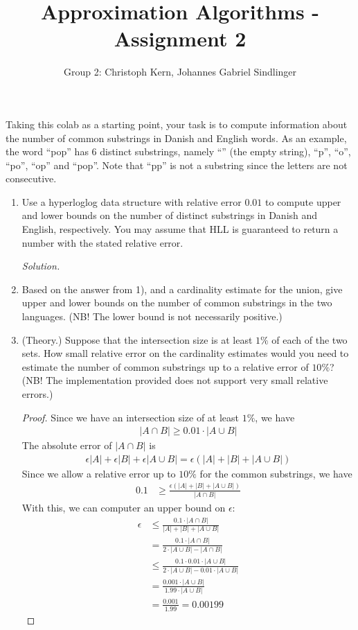 \documentclass{article}
\title{Approximation Algorithms - Assignment 2}
\author{Group 2: Christoph Kern, Johannes Gabriel Sindlinger}
\begin{document}
\maketitle

Taking this colab as a starting point, your task is to compute information about the number of common substrings in Danish and English words. As an example, the word ``pop'' has 6 distinct substrings, namely ``'' (the empty string), ``p'', ``o'', ``po'', ``op'' and ``pop''. Note that ``pp'' is not a substring since the letters are not consecutive.

\begin{enumerate}
    \item Use a hyperloglog data structure with relative error $0.01$ to compute upper and lower bounds on the number of distinct substrings in Danish and English, respectively. You may assume that HLL is guaranteed to return a number with the stated relative error.

    \emph{Solution.} 
    
    
    \item Based on the answer from 1), and a cardinality estimate for the union, give upper and lower bounds on the number of common substrings in the two languages. (NB! The lower bound is not necessarily positive.)
    \item (Theory.) Suppose that the intersection size is at least $1\%$ of each of the two sets. How small relative error on the cardinality estimates would you need to estimate the number of common substrings up to a relative error of $10\%$? (NB! The implementation provided does not support very small relative errors.)

    \begin{proof}
        Since we have an intersection size of at least $1\%$, we have
        \begin{align}
            |A \cap B| \ge 0.01 \cdot |A \cup B|
        \end{align}
        The absolute error of $|A \cap B|$ is
        \begin{align}
            \epsilon|A| + \epsilon|B| + \epsilon|A \cup B| = \epsilon(|A| + |B| + |A \cup B|)
        \end{align}
        Since we allow a relative error up to $10\%$ for the common substrings, we have
        \begin{align}
            0.1 &\ge \frac{\epsilon(|A| + |B| + |A \cup B|)}{|A \cap B|}
        \end{align}
        With this, we can computer an upper bound on $\epsilon$:
        \begin{align}
              \epsilon &\le \frac{0.1 \cdot |A \cap B|}{|A| + |B| + |A \cup B|}\\
              &= \frac{0.1 \cdot |A \cap B|}{2 \cdot |A \cup B| - |A \cap B|}\\
              &\le \frac{0.1 \cdot 0.01 \cdot |A \cup B|}{2 \cdot |A \cup B| - 0.01 \cdot |A \cup B|}\\
              &= \frac{0.001 \cdot |A \cup B|}{1.99 \cdot |A \cup B|}\\
              &= \frac{0.001}{1.99} = 0.00199
        \end{align}


\end{proof}
\end{enumerate}
\end{document}
